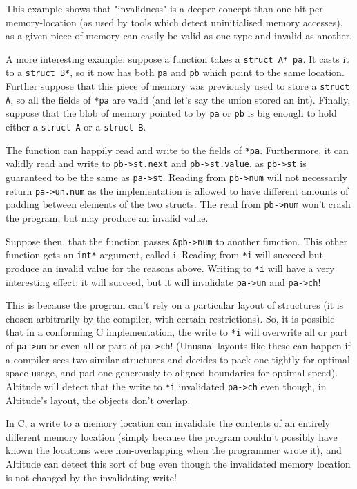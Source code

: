 \documentclass[10pt,a4paper]{report}
\begin{document}
This example shows that "invalidness" is a deeper concept than one-bit-per-memory-location (as used by tools which detect uninitialised memory accesses), as a given piece of memory can easily be valid as one type and invalid as another.

A more interesting example: suppose a function takes a \lstinline{struct A* pa}. It casts it to a \lstinline{struct B*}, so it now has both \lstinline{pa} and \lstinline{pb} which point to the same location. Further suppose that this piece of memory was previously used to store a \lstinline{struct A}, so all the fields of \lstinline{*pa} are valid (and let's say the union stored an int). Finally, suppose that the blob of memory pointed to by \lstinline{pa} or \lstinline{pb} is big enough to hold either a \lstinline{struct A} or a \lstinline{struct B}.

The function can happily read and write to the fields of \lstinline{*pa}. Furthermore, it can validly read and write to \lstinline{pb->st.next} and \lstinline{pb->st.value}, as \lstinline{pb->st} is guaranteed to be the same as \lstinline{pa->st}. Reading from \lstinline{pb->num} will not necessarily return \lstinline{pa->un.num} as the implementation is allowed to have different amounts of padding between elements of the two structs. The read from \lstinline{pb->num} won't crash the program, but may produce an invalid value.

Suppose then, that the function passes \lstinline{&pb->num} to another function. This other function gets an \lstinline{int*} argument, called i. Reading from \lstinline{*i} will succeed but produce an invalid value for the reasons above. Writing to \lstinline{*i} will have a very interesting effect: it will succeed, but it will invalidate \lstinline{pa->un} and \lstinline{pa->ch}!

This is because the program can't rely on a particular layout of structures (it is chosen arbitrarily by the compiler, with certain restrictions). So, it is possible that in a conforming C implementation, the write to \lstinline{*i} will overwrite all or part of \lstinline{pa->un} or even all or part of \lstinline{pa->ch}! (Unusual layouts like these can happen if a compiler sees two similar structures and decides to pack one tightly for optimal space usage, and pad one generously to aligned boundaries for optimal speed). Altitude will detect that the write to \lstinline{*i} invalidated \lstinline{pa->ch} even though, in Altitude's layout, the objects don't overlap.

In C, a write to a memory location can invalidate the contents of an entirely different memory location (simply because the program couldn't possibly have known the locations were non-overlapping when the programmer wrote it), and Altitude can detect this sort of bug even though the invalidated memory location is not changed by the invalidating write!
\end{document}
